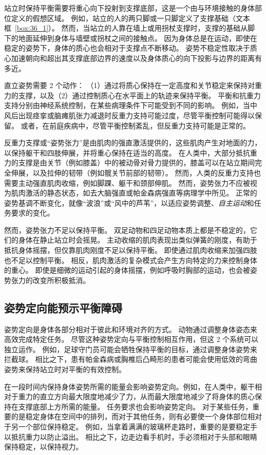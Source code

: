 站立时保持平衡需要将重心向下投射到支撑底部，这是一个由与环境接触的身体部位定义的假想区域。
例如，站立的人的两只脚或一只脚定义了支撑基础（文本框~\ref{box:36_1}）。
然而，当站立的人靠在墙上或用拐杖支撑时，支撑的基础从脚下的地面延伸到身体与墙壁或拐杖之间的接触点。
因为身体总是在运动，即使在稳定的姿势下，身体的质心也会相对于支撑点不断移动。
姿势不稳定性取决于质心加速朝向和超出其支撑底部边界的速度以及身体质心的向下投影与边界的距离有多近。


直立姿势需要 2 个动作：
（1）通过将质心保持在一定高度和关节稳定来保持对重力的支撑，以及（2）通过控制质心在水平面上的轨迹来保持平衡。
平衡和抗重力支持分别由神经系统控制，在某些病理条件下可能受到不同的影响。
例如，当中风后出现痉挛或脑瘫肌张力减退时反重力支持可能过度，尽管平衡控制可能得以保留。
或者，在前庭疾病中，尽管平衡控制紊乱，但反重力支持可能是正常的。


反重力支撑或“姿势张力”是由肌肉的强直激活提供的，这些肌肉产生对地面的力，以保持躯干和四肢伸展，并将重心保持在适当的高度。
在人类中，大部分抵抗重力的支撑是由关节（例如膝盖）中的被动骨对骨力提供的，膝盖可以在站立期间完全伸展，以及拉伸的韧带（例如髋关节前部的韧带）。
然而，人类的反重力支持也需要主动强直肌肉收缩，例如脚踝、躯干和颈部伸肌。
然而，姿势张力不应被视为肌肉激活的静态状态，如去大脑强直或帕金森病强直等病理学中所见。
正常的姿势基调不断变化，就像“波浪”或“风中的芦苇”，以适应姿势调整、\textit{自主运动}和任务要求的变化。


然而，姿势张力不足以保持平衡。
双足动物和四足动物本质上都是不稳定的，它们的身体在静止站立时会摇晃。
主动收缩的肌肉表现出类似弹簧的刚度，有助于抵抗身体摇摆，但仅靠肌肉刚度不足以保持平衡。
即使通过肌肉收缩来加强四肢也不足以控制平衡。
相反，肌肉激活的复杂模式会产生方向特定的力来控制身体的重心。
即使是细微的运动引起的身体摇摆，例如呼吸时胸部的运动，也会被姿势张力的改变所积极抵消。



\subsection{姿势定向能预示平衡障碍}

姿势定向是身体各部分相对于彼此和环境对齐的方式。 动物通过调整身体姿态来高效完成特定任务。
尽管这种姿势定向与平衡控制相互作用，但这 2 个系统可以独立运作。
例如，足球守门员可能会牺牲保持平衡的目标，通过调整身体姿势来拦截球。
相比之下，患有帕金森病或胸椎后凸畸形的患者可能会使用低效的弯曲姿势来保持站立时对平衡的有效控制。


在一段时间内保持身体姿势所需的能量会影响姿势定向。例如，在人类中，躯干相对于重力的直立方向最大限度地减少了力，从而最大限度地减少了将身体的质心保持在支撑底部上方所需的能量。
任务要求也会影响姿势定向。
对于某些任务，重要的是稳定身体在空间中的排列，而对于其他任务，则有必要使一个身体部位相对于另一个部位保持稳定。
例如，当拿着满满的玻璃杯走路时，重要的是要稳定手以抵抗重力以防止溢出。
相比之下，边走边看手机时，手必须相对于头部和眼睛保持稳定，以保持视力。


